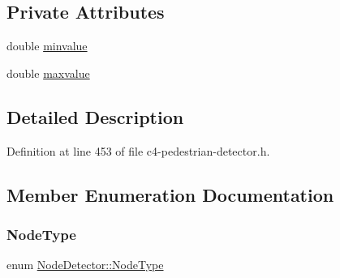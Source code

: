 \subsection*{Private Attributes}
\begin{DoxyCompactItemize}
\item 
double \mbox{\hyperlink{class_node_detector_ab069f95bc20f00754a15c62c932b7e77}{minvalue}}
\item 
double \mbox{\hyperlink{class_node_detector_adb33cb202a422de76467e72f1b146610}{maxvalue}}
\end{DoxyCompactItemize}


\subsection{Detailed Description}


Definition at line 453 of file c4-\/pedestrian-\/detector.\+h.



\subsection{Member Enumeration Documentation}
\mbox{\label{class_node_detector_a7188c48dfe6b88b3b7f47c599c4832bd}} 
\subsubsection{\texorpdfstring{Node\+Type}{NodeType}}
{\footnotesize\ttfamily enum \mbox{\hyperlink{class_node_detector_a7188c48dfe6b88b3b7f47c599c4832bd}{Node\+Detector\+::\+Node\+Type}}}

